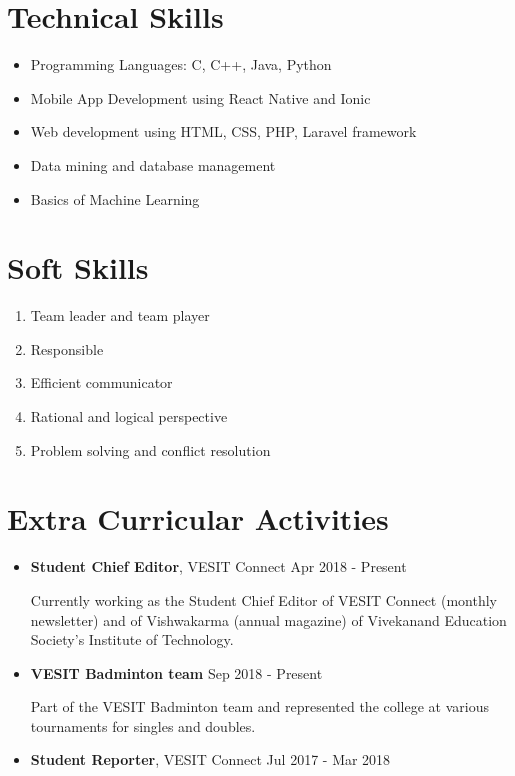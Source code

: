 \documentclass[margin]{res}
\begin{document}
\begin{resume}
\section{Technical Skills}
\begin{itemize}
  \item Programming Languages: C, C++, Java, Python
  \item Mobile App Development using React Native and Ionic
  \item Web development using HTML, CSS, PHP, Laravel framework
  \item Data mining and database management
  \item Basics of Machine Learning
\end{itemize}

\section{Soft Skills}
\begin{enumerate}
  \item Team leader and team player
  \item Responsible
  \item Efficient communicator
  \item Rational and logical perspective
  \item Problem solving and conflict resolution
\end{enumerate}

\section{Extra Curricular Activities}
\begin{itemize}
  \item {\bf Student Chief Editor}, VESIT Connect \hfill Apr 2018 - Present
  
  Currently working as the Student Chief Editor of VESIT Connect (monthly newsletter) and of Vishwakarma (annual magazine)  of Vivekanand Education Society's Institute of Technology. 
  \item {\bf VESIT Badminton team} \hfill Sep 2018 - Present
  
  Part of the VESIT Badminton team and represented the college at various tournaments for singles and doubles. 
  \item {\bf Student Reporter}, VESIT Connect \hfill Jul 2017 - Mar 2018
  

\end{itemize}
\end{resume}
\end{document}
